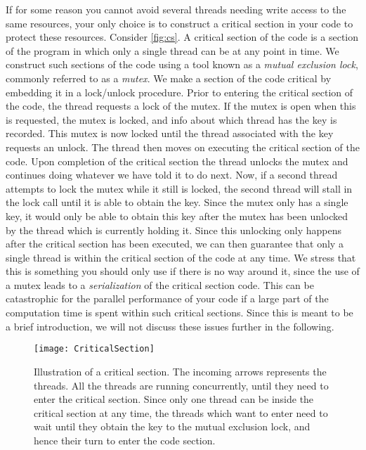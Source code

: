If for some reason you cannot avoid several threads needing write access to the
same resources, your only choice is to construct a critical section in your code
to protect these resources. Consider \autoref{fig:cs}. A critical section of the
code is a section of the program in which only a single thread can be at any
point in time. We construct such sections of the code using a tool known as a
\emph{mutual exclusion lock}, commonly referred to as a \emph{mutex}. We make a
section of the code critical by embedding it in a lock/unlock procedure. Prior
to entering the critical section of the code, the thread requests a lock of the
mutex. If the mutex is open when this is requested, the mutex is locked, and
info about which thread has the key is recorded. This mutex is now locked until
the thread associated with the key requests an unlock. The thread then moves on
executing the critical section of the code. Upon completion of the critical
section the thread unlocks the mutex and continues doing whatever we have told
it to do next. Now, if a second thread attempts to lock the mutex while it still
is locked, the second thread will stall in the lock call until it is able to
obtain the key. Since the mutex only has a single key, it would only be able to
obtain this key after the mutex has been unlocked by the thread which is
currently holding it. Since this unlocking only happens after the critical
section has been executed, we can then guarantee that only a single thread is
within the critical section of the code at any time. We stress that this is
something you should only use if there is no way around it, since the use of a
mutex leads to a \emph{serialization} of the critical section code. This can be
catastrophic for the parallel performance of your code if a large part of the
computation time is spent within such critical sections. Since this is meant to
be a brief introduction, we will not discuss these issues further in the
following.

\begin{figure}[ht]
  \begin{center}
    \texttt{[image: CriticalSection]}
  \end{center}
  \caption{
    Illustration of a critical section. The incoming arrows represents the
    threads. All the threads are running concurrently, until they need to enter
    the critical section. Since only one thread can be inside the critical
    section at any time, the threads which want to enter need to wait until they
    obtain the key to the mutual exclusion lock, and hence their turn to enter
    the code section.
  }
  \label{fig:cs}
\end{figure}

